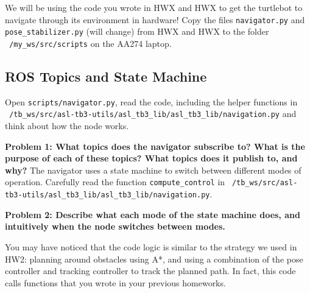 \documentclass{article}
\begin{document}





{\color{blue}
We will be using the code you wrote in HWX and HWX to get the turtlebot to navigate through its environment in hardware! Copy the files \texttt{navigator.py} and \texttt{pose\_stabilizer.py} (will change) from HWX and HWX to the folder \texttt{~/my\_ws/src/scripts} on the AA274 laptop. 
}

\subsection*{ROS Topics and State Machine}
\color{blue}
Open \texttt{scripts/navigator.py}, read the code, including the helper functions in \\ \texttt{~/tb\_ws/src/asl-tb3-utils/asl\_tb3\_lib/asl\_tb3\_lib/navigation.py} and think about how the node works.

\textbf{Problem 1: What topics does the navigator subscribe to? What is the purpose of each of these topics? What topics does it publish to, and why?}
\newline
\newline 
The navigator uses a state machine to switch between different modes of operation. Carefully read the function \texttt{compute\_control} in \texttt{~/tb\_ws/src/asl-tb3-utils/asl\_tb3\_lib/asl\_tb3\_lib/navigation.py}.

\color{black}
\textbf{Problem 2: Describe what each mode of the state machine does, and intuitively when the node switches between modes.}

You may have noticed that the code logic is similar to the strategy we used in HW2: planning around obstacles using A*, and using a combination of the pose controller and tracking controller to track the planned path. In fact, this code calls functions that you wrote in your previous homeworks. 
\\
\end{document}
